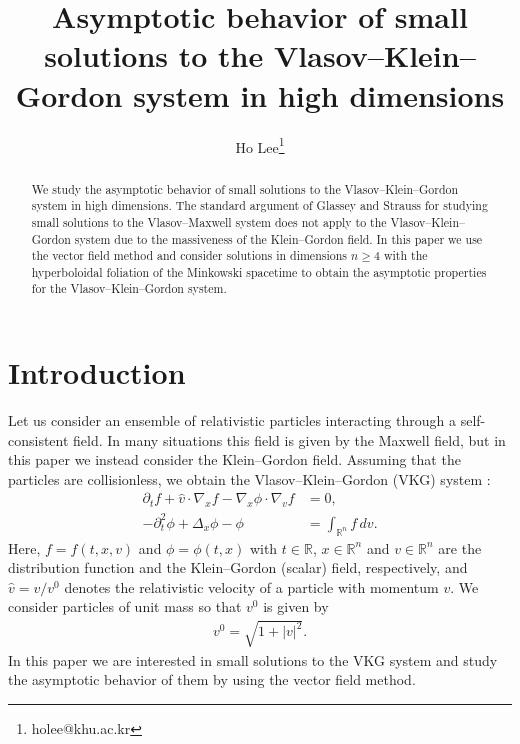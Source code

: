 \documentclass{article}
\title{Asymptotic behavior of small solutions to the Vlasov--Klein--Gordon system in high dimensions}
\author{Ho Lee\footnote{holee@khu.ac.kr}}
\affil{Department of Mathematics, College of Sciences, Kyung Hee University, Seoul 02447, Republic of Korea}
\newcommand{\bbr}{{\mathbb R}}
\begin{document}
\maketitle

\begin{abstract}
We study the asymptotic behavior of small solutions to the Vlasov--Klein--Gordon system in high dimensions. The standard argument of Glassey and Strauss \cite{GS87} for studying small solutions to the Vlasov--Maxwell system does not apply to the Vlasov--Klein--Gordon system due to the massiveness of the Klein--Gordon field. In this paper we use the vector field method and consider solutions in dimensions $ n \geq 4 $ with the hyperboloidal foliation of the Minkowski spacetime to obtain the asymptotic properties for the Vlasov--Klein--Gordon system.
\end{abstract}









%
\section{Introduction}
Let us consider an ensemble of relativistic particles interacting through a self-consistent field. In many situations this field is given by the Maxwell field, but in this paper we instead consider the Klein--Gordon field. Assuming that the particles are collisionless, we obtain the Vlasov--Klein--Gordon (VKG) system \cite{KRST03, KRST05}:
\begin{align*}
\partial_t f + \hat{ v } \cdot \nabla_x f - \nabla_ x \phi \cdot \nabla_v f & = 0 , \\
- \partial_t^2 \phi + \Delta_x \phi - \phi & = \int_{ \bbr^n } f \, dv .
\end{align*}
Here, $ f = f ( t , x , v ) $ and $ \phi = \phi ( t , x ) $ with $ t \in \bbr $, $ x \in \bbr^n $ and $ v \in \bbr^n $ are the distribution function and the Klein--Gordon (scalar) field, respectively, and $ \hat{ v } = v / v^0 $ denotes the relativistic velocity of a particle with momentum $ v $. We consider particles of unit mass so that $ v^0 $ is given by
\begin{align*}
v^0 = \sqrt{ 1 + | v |^2 } .
\end{align*}
In this paper we are interested in small solutions to the VKG system and study the asymptotic behavior of them by using the vector field method.
\end{document}
